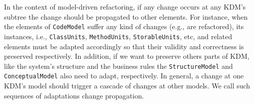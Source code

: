


 



In the context of model-driven refactoring, if any change occurs at any KDM's subtree the change should be propagated to other elements.
%
%
For instance, when the elements of \texttt{CodeModel} suffer any kind of changes (e.g., are refactored), its instances, i.e., \texttt{ClassUnits}, \texttt{MethodUnits}, \texttt{StorableUnits}, etc, and related elements must be adapted accordingly so that their validity and correctness is preserved respectively. In addition, if we want to preserve others parts of KDM, like the system's structure and the business rules the  \texttt{StructureModel} and \texttt{ConceptualModel} also need to adapt, respectively. %
In general, a change at one KDM's model should trigger a cascade of changes at other models. We call such sequences of adaptations change propagation.

